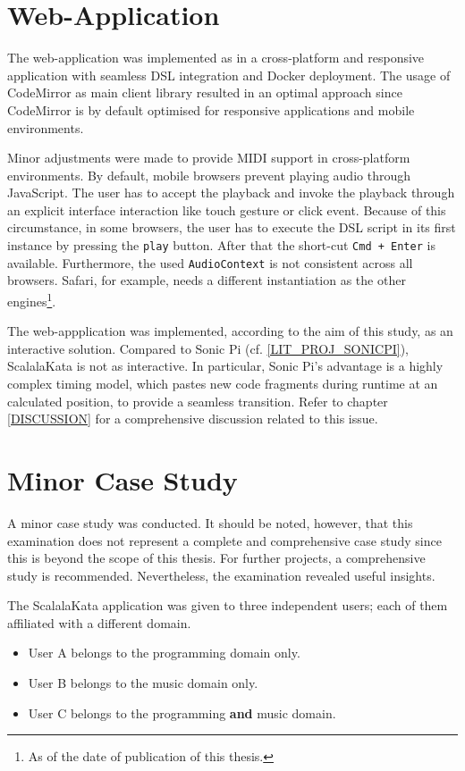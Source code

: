 \section{Web-Application}
\label{RESULTS_WEBAPP}
The web-application was implemented as in a cross-platform and responsive application with seamless DSL integration and Docker deployment. The usage of CodeMirror as main client library resulted in an optimal approach since CodeMirror is by default optimised for responsive applications and mobile environments.

Minor adjustments were made to provide MIDI support in cross-platform environments. By default, mobile browsers prevent playing audio through JavaScript. The user has to accept the playback and invoke the playback through an explicit interface interaction like touch gesture or click event. Because of this circumstance, in some browsers, the user has to execute the DSL script in its first instance by pressing the \texttt{play} button. After that the short-cut \texttt{Cmd + Enter} is available. Furthermore, the used \texttt{AudioContext} is not consistent across all browsers. Safari, for example, needs a different instantiation as the other engines\footnote{As of the date of publication of this thesis.}.

The web-appplication was implemented, according to the aim of this study, as an interactive solution. Compared to Sonic Pi (cf. \ref{LIT_PROJ_SONICPI}), ScalalaKata is not as interactive. In particular, Sonic Pi's advantage is a highly complex timing model, which pastes new code fragments during runtime at an calculated position, to provide a seamless transition.\cite{Aaron2014} Refer to chapter \ref{DISCUSSION} for a comprehensive discussion related to this issue.


\section{Minor Case Study}
\label{RESULTS_STUDY}
A minor case study was conducted. It should be noted, however, that this examination does not represent a complete and comprehensive case study since this is beyond the scope of this thesis. For further projects, a comprehensive study is recommended. Nevertheless, the examination revealed useful insights.

The ScalalaKata application was given to three independent users; each of them affiliated with a different domain.

\begin{itemize}
\item User A belongs to the programming domain only.
\item User B belongs to the music domain only.
\item User C belongs to the programming \textbf{and} music domain.
\end{itemize}

